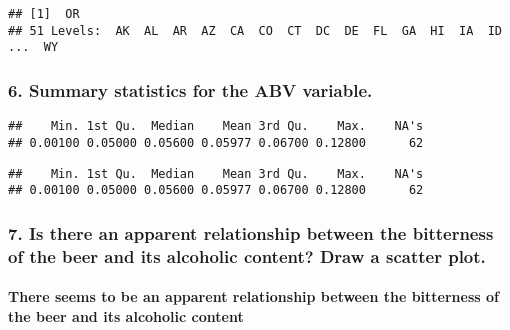 \documentclass[]{article}
\newenvironment{Shaded}{\begin{snugshade}}{\end{snugshade}}
\newcommand{\KeywordTok}[1]{\textcolor[rgb]{0.13,0.29,0.53}{\textbf{{#1}}}}
\newcommand{\NormalTok}[1]{{#1}}
\let\oldparagraph\paragraph
\renewcommand{\paragraph}[1]{\oldparagraph{#1}\mbox{}}
\begin{document}
\begin{verbatim}
## [1]  OR
## 51 Levels:  AK  AL  AR  AZ  CA  CO  CT  DC  DE  FL  GA  HI  IA  ID ...  WY
\end{verbatim}

\subsubsection{6. Summary statistics for the ABV
variable.}\label{summary-statistics-for-the-abv-variable.}

\begin{Shaded}
\end{Shaded}

\begin{verbatim}
##    Min. 1st Qu.  Median    Mean 3rd Qu.    Max.    NA's 
## 0.00100 0.05000 0.05600 0.05977 0.06700 0.12800      62
\end{verbatim}

\begin{Shaded}
\end{Shaded}

\begin{verbatim}
##    Min. 1st Qu.  Median    Mean 3rd Qu.    Max.    NA's 
## 0.00100 0.05000 0.05600 0.05977 0.06700 0.12800      62
\end{verbatim}

\subsubsection{7. Is there an apparent relationship between the
bitterness of the beer and its alcoholic content? Draw a scatter
plot.}\label{is-there-an-apparent-relationship-between-the-bitterness-of-the-beer-and-its-alcoholic-content-draw-a-scatter-plot.}

\paragraph{There seems to be an apparent relationship between the
bitterness of the beer and its alcoholic
content}\label{there-seems-to-be-an-apparent-relationship-between-the-bitterness-of-the-beer-and-its-alcoholic-content}
\end{document}
